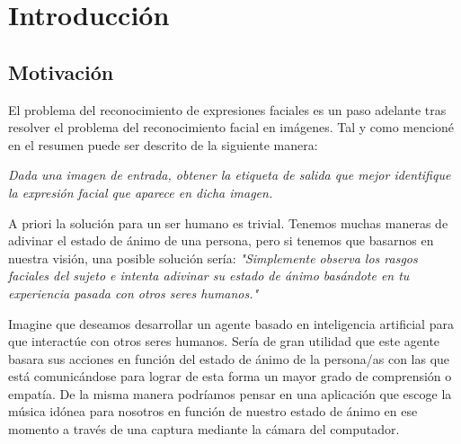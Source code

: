 \documentclass[a4paper,11pt]{book}
\begin{document}



%

%

\chapter{Introducción}


\section{Motivación}

El problema del reconocimiento de expresiones faciales es un paso adelante tras resolver el problema del reconocimiento facial en imágenes. Tal y como mencioné en el resumen puede ser descrito de la siguiente manera:
\begin{center}
	\textit{Dada una imagen de entrada, obtener la etiqueta de salida que mejor identifique la expresión facial que aparece en dicha imagen.}\\
\end{center}

A priori la solución para un ser humano es trivial. Tenemos muchas maneras de adivinar el estado de ánimo de una persona, pero si tenemos que basarnos en nuestra visión, una posible solución sería:
\textit{"Simplemente observa los rasgos faciales del sujeto e intenta adivinar su estado de ánimo basándote en tu experiencia pasada con otros seres humanos."\\}

Imagine que deseamos desarrollar un agente basado en inteligencia artificial para que interactúe con otros seres humanos. Sería de gran utilidad que este agente basara sus acciones en función del estado de ánimo de la persona/as con las que está comunicándose para lograr de esta forma un mayor grado de comprensión o empatía. De la misma manera podríamos pensar en una aplicación que escoge la música idónea para nosotros en función de nuestro estado de ánimo en ese momento a través de una captura mediante la cámara del computador.
\end{document}
